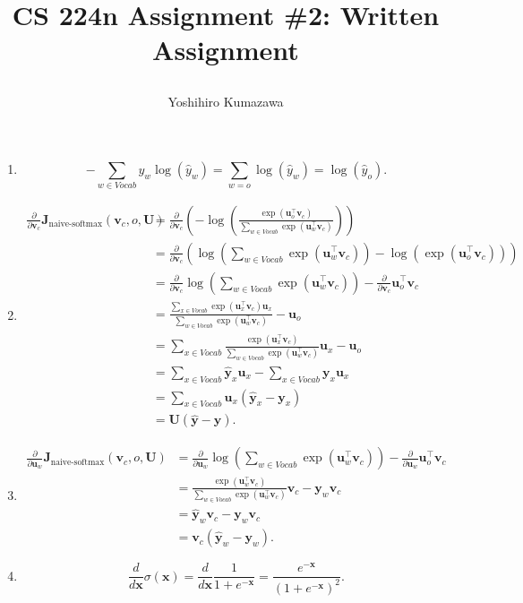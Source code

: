 \documentclass[12pt]{article}
\title{
  \vspace{-2cm}
  CS 224n Assignment \#2: Written Assignment \\
  \author{Yoshihiro Kumazawa}
}
\begin{document}
\maketitle
\begin{enumerate}[label=(\alph*)]
\item \[-\sum_{w\in Vocab}y_w\log(\hat{y}_w)=\sum_{w=o}\log(\hat{y}_w)=\log(\hat{y}_o).\]
\item \begin{align*}
\frac{\partial}{\partial\bm{v}_c}\bm{J}_{\textrm{naive-softmax}}(\bm{v}_c,o,\bm{U}) &=\frac{\partial}{\partial\bm{v}_c}\left(-\log\left(\frac{\exp(\bm{u}_o^\top\bm{v}_c)}{\sum_{w\in Vocab}\exp(\bm{u}_w^\top\bm{v}_c)}\right)\right) \\
&=\frac{\partial}{\partial\bm{v}_c}\left(\log\left(\sum_{w\in Vocab}\exp(\bm{u}_w^\top\bm{v}_c)\right)-\log\left(\exp(\bm{u}_o^\top\bm{v}_c)\right)\right) \\
&=\frac{\partial}{\partial\bm{v}_c}\log\left(\sum_{w\in Vocab}\exp(\bm{u}_w^\top\bm{v}_c)\right)-\frac{\partial}{\partial\bm{v}_c}\bm{u}_o^\top\bm{v}_c \\
&=\frac{\sum_{x\in Vocab}\exp(\bm{u}_x^\top\bm{v}_c)\bm{u}_x}{\sum_{w\in Vocab}\exp(\bm{u}_w^\top\bm{v}_c)}-\bm{u}_o \\
&=\sum_{x\in Vocab}\frac{\exp(\bm{u}_x^\top\bm{v}_c)}{\sum_{w\in Vocab}\exp(\bm{u}_w^\top\bm{v}_c)}\bm{u}_x-\bm{u}_o \\
&=\sum_{x\in Vocab}\bm{\hat{y}}_x\bm{u}_x-\sum_{x\in Vocab}\bm{y}_x\bm{u}_x \\
&=\sum_{x\in Vocab}\bm{u}_x(\bm{\hat{y}}_x-\bm{y}_x) \\
&=\bm{U}(\bm{\hat{y}}-\bm{y}).
\end{align*}
\item \begin{align*} \frac{\partial}{\partial\bm{u}_w}\bm{J}_{\textrm{naive-softmax}}(\bm{v}_c,o,\bm{U}) &=\frac{\partial}{\partial\bm{u}_w}\log\left(\sum_{w\in Vocab}\exp(\bm{u}_w^\top\bm{v}_c)\right)-\frac{\partial}{\partial\bm{u}_w}\bm{u}_o^\top\bm{v}_c \\
&=\frac{\exp(\bm{u}_w^\top\bm{v}_c)}{\sum_{w\in Vocab}\exp(\bm{u}_w^\top\bm{v}_c)}\bm{v}_c-\bm{y}_w\bm{v}_c \\
&=\bm{\hat{y}}_w\bm{v}_c-\bm{y}_w\bm{v}_c \\
&=\bm{v}_c(\bm{\hat{y}}_w-\bm{y}_w).
\end{align*}
\item \[\frac{d}{d\bm{x}}\sigma(\bm{x})=\frac{d}{d\bm{x}}\frac{1}{1+e^{-\bm{x}}}=\frac{e^{-\bm{x}}}{(1+e^{-\bm{x}})^2}.\]

\end{enumerate}
\end{document}
